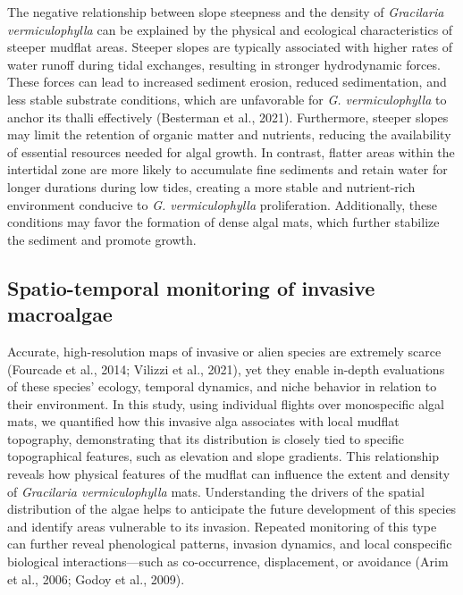 \documentclass[
  letterpaper,
  DIV=11,
  numbers=noendperiod]{scrartcl}
\begin{document}
The negative relationship between slope steepness and the density of
\emph{Gracilaria vermiculophylla} can be explained by the physical and
ecological characteristics of steeper mudflat areas. Steeper slopes are
typically associated with higher rates of water runoff during tidal
exchanges, resulting in stronger hydrodynamic forces. These forces can
lead to increased sediment erosion, reduced sedimentation, and less
stable substrate conditions, which are unfavorable for \emph{G.
vermiculophylla} to anchor its thalli effectively (Besterman et al.,
2021). Furthermore, steeper slopes may limit the retention of organic
matter and nutrients, reducing the availability of essential resources
needed for algal growth. In contrast, flatter areas within the
intertidal zone are more likely to accumulate fine sediments and retain
water for longer durations during low tides, creating a more stable and
nutrient-rich environment conducive to \emph{G. vermiculophylla}
proliferation. Additionally, these conditions may favor the formation of
dense algal mats, which further stabilize the sediment and promote
growth.

\subsection{Spatio-temporal monitoring of invasive
macroalgae}\label{spatio-temporal-monitoring-of-invasive-macroalgae}

Accurate, high-resolution maps of invasive or alien species are
extremely scarce (Fourcade et al., 2014; Vilizzi et al., 2021), yet they
enable in-depth evaluations of these species' ecology, temporal
dynamics, and niche behavior in relation to their environment. In this
study, using individual flights over monospecific algal mats, we
quantified how this invasive alga associates with local mudflat
topography, demonstrating that its distribution is closely tied to
specific topographical features, such as elevation and slope gradients.
This relationship reveals how physical features of the mudflat can
influence the extent and density of \emph{Gracilaria vermiculophylla}
mats. Understanding the drivers of the spatial distribution of the algae
helps to anticipate the future development of this species and identify
areas vulnerable to its invasion. Repeated monitoring of this type can
further reveal phenological patterns, invasion dynamics, and local
conspecific biological interactions---such as co-occurrence,
displacement, or avoidance (Arim et al., 2006; Godoy et al., 2009).
\end{document}
